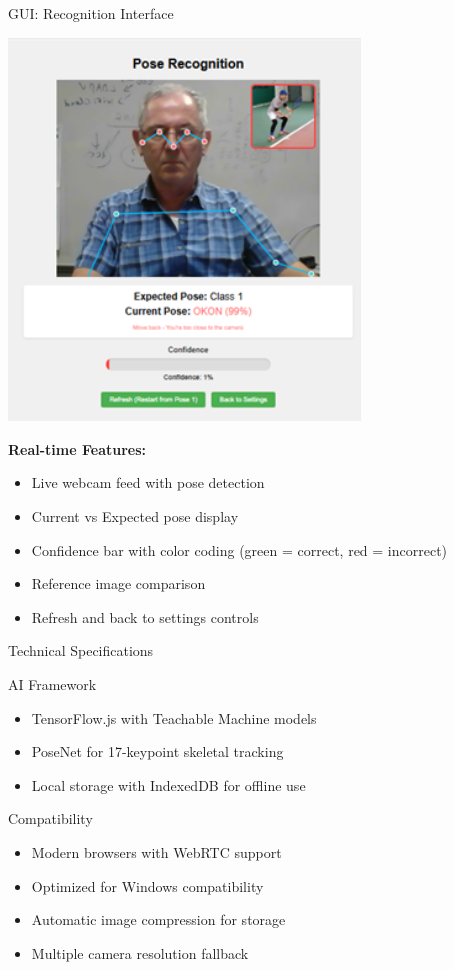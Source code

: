 \documentclass[11pt]{beamer}
\begin{document}
\begin{frame}{GUI: Recognition Interface}
    \begin{center}
        \includegraphics[width=0.7\textwidth]{GUI2_1752049449853.png}
    \end{center}
    \small{
    \textbf{Real-time Features:}
    \begin{itemize}
        \item Live webcam feed with pose detection
        \item Current vs Expected pose display
        \item Confidence bar with color coding (green = correct, red = incorrect)
        \item Reference image comparison
        \item Refresh and back to settings controls
    \end{itemize}
    }
\end{frame}

\begin{frame}{Technical Specifications}
    \begin{block}{AI Framework}
        \begin{itemize}
            \item TensorFlow.js with Teachable Machine models
            \item PoseNet for 17-keypoint skeletal tracking
            \item Local storage with IndexedDB for offline use
        \end{itemize}
    \end{block}
    \begin{block}{Compatibility}
        \begin{itemize}
            \item Modern browsers with WebRTC support
            \item Optimized for Windows compatibility
            \item Automatic image compression for storage
            \item Multiple camera resolution fallback
        \end{itemize}
    \end{block}
\end{frame}
\end{document}
